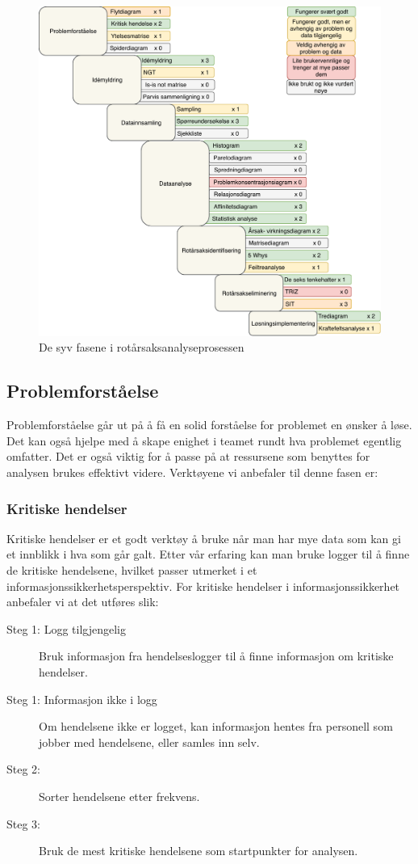 \begin{figure}[H]
    \centering
    \includegraphics[scale=0.6]{main/bilder/RCA_Prosess_rettningslinjer.pdf}
    \caption[RCA-prosess]{De syv fasene i rotårsaksanalyseprosessen}
    \label{fig:prosess_veileder}
\end{figure}

\subsection{Problemforståelse}
Problemforståelse går ut på å få en solid forståelse for problemet en ønsker å løse. Det kan også hjelpe med å skape enighet i teamet rundt hva problemet egentlig omfatter. Det er også viktig for å passe på at ressursene som benyttes for analysen brukes effektivt videre. 
Verktøyene vi anbefaler til denne fasen er: 

\subsubsection{Kritiske hendelser} 
Kritiske hendelser er et godt verktøy å bruke når man har mye data som kan gi et innblikk i hva som går galt. Etter vår erfaring kan man bruke logger til å finne de kritiske hendelsene, hvilket passer utmerket i et informasjonssikkerhetsperspektiv. For kritiske hendelser i informasjonssikkerhet anbefaler vi at det utføres slik: 
\begin{description}
    \item [Steg 1: Logg tilgjengelig] Bruk informasjon fra hendelseslogger til å finne informasjon om kritiske hendelser.
    \item [Steg 1: Informasjon ikke i logg] Om hendelsene ikke er logget, kan informasjon hentes fra personell som jobber med hendelsene, eller samles inn selv.
    \item [Steg 2:] Sorter hendelsene etter frekvens.
    \item [Steg 3:] Bruk de mest kritiske hendelsene som startpunkter for analysen.
\end{description}


